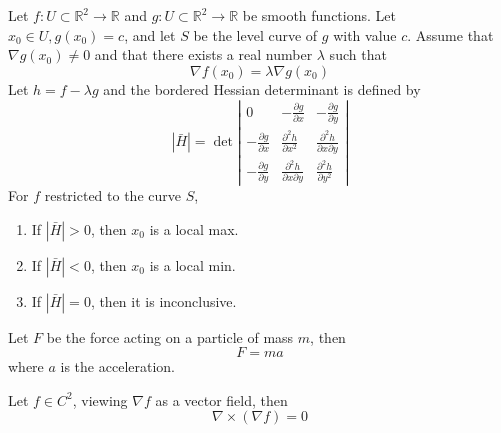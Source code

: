 \documentclass[openany]{book}
\newcommand{\R}{\mathbb{R}}
\begin{document}
\begin{prop}
    Let $f: U\subset\R^2\to\R$ and $g:U\subset\R^2\to\R$ be smooth functions. Let $x_0\in U, g(x_0)=c$, and let $S$ be the level curve of $g$ with value $c$. Assume that $\nabla g(x_0)\neq 0$ and that there exists a real number $\lambda$ such that 
    \begin{equation*}
        \nabla f(x_0)=\lambda\nabla g(x_0)
    \end{equation*}
    Let $h=f-\lambda g$ and the bordered Hessian determinant is defined by 
    \begin{equation*}
        |\bar{H}|=\det\left|\begin{matrix}
            0&-\frac{\partial g}{\partial x}&-\frac{\partial g}{\partial y}\\
            -\frac{\partial g}{\partial x} &\frac{\partial^2h}{\partial x^2}&\frac{\partial^2h}{\partial x\partial y}\\
            -\frac{\partial g}{\partial y} &\frac{\partial^2h}{\partial x\partial y}&\frac{\partial^2h}{\partial y^2}
        \end{matrix} \right|
    \end{equation*}
    For $f$ restricted to the curve $S$, 
    \begin{enumerate}
        \item If  $|\bar{H}|>0$, then $x_0$ is a local max.
        \item If $|\bar{H}|<0$, then $x_0$ is a local min.
        \item If $|\bar{H}|=0$, then it is inconclusive.
    \end{enumerate}
\end{prop}


\begin{prop}
    Let $F$ be the force acting on a particle of mass $m$, then 
    \begin{equation*}
        F=ma
    \end{equation*}
    where $a$ is the acceleration.
\end{prop}



\begin{prop}
    Let $f\in C^2$, viewing $\nabla f$ as a vector field, then
    \begin{equation*}
        \nabla\times(\nabla f)=0
    \end{equation*}    
\end{prop}
\end{document}
